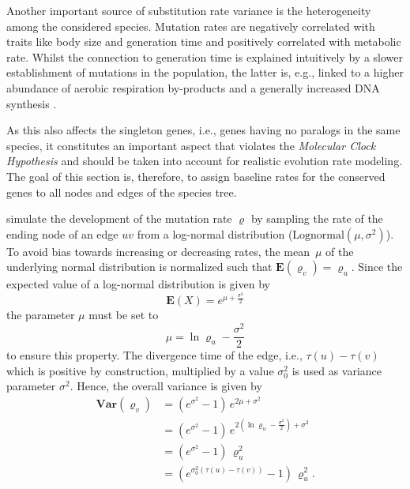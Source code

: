 \documentclass[hidelinks,11pt]{scrreprt}
\begin{document}
Another important source of substitution rate variance is the heterogeneity among the considered species. Mutation rates are negatively correlated with traits like body size and generation time and positively correlated with metabolic rate. Whilst the connection to generation time is explained intuitively by a slower establishment of mutations in the population, the latter is, e.g., linked to a higher abundance of aerobic respiration by-products and a generally increased DNA synthesis \citep{martin1993,gillooly2005,nabholz2007}.

As this also affects the singleton genes, i.e., genes having no paralogs in the same species, it constitutes an important aspect that violates the \emph{Molecular Clock Hypothesis} and should be taken into account for realistic evolution rate modeling.
The goal of this section is, therefore, to assign baseline rates for the conserved genes to all nodes and edges of the species tree.

\citet{kishino2001} simulate the development of the mutation rate $\varrho$ by sampling the rate of the ending node of an edge $uv$ from a log-normal distribution ($\textrm{Lognormal}(\mu,\sigma^2)$). To avoid bias towards increasing or decreasing rates, the mean~$\mu$ of the underlying normal distribution is normalized such that $\mathbf{E}(\varrho_v) = \varrho_u$. Since the expected value of a log-normal distribution is given by
\begin{equation}
\mathbf{E}(X) = e^{\mu + \frac{\sigma^2}{2}}
\end{equation}
the parameter $\mu$ must be set to 
\begin{equation}
\mu = \ln \varrho_u - \frac{\sigma^2}{2}
\end{equation}
to ensure this property. The divergence time of the edge, i.e., $\tau(u) - \tau(v)$ which is positive by construction, multiplied by a value $\sigma^2_0$ is used as variance parameter $\sigma^2$. Hence, the overall variance is given by
\begin{equation}
\begin{aligned}
\mathbf{Var}(\varrho_v) &= (e^{\sigma^2}-1)\, e^{2\mu+\sigma^2} \\
&= (e^{\sigma^2}-1)\, e^{2(\ln \varrho_u - \frac{\sigma^2}{2})+\sigma^2}\\
&= (e^{\sigma^2} - 1)\,\varrho_u^2\\
&= (e^{\sigma_0^2 (\tau(u)-\tau(v))} - 1)\,\varrho_u^2.
\end{aligned}
\end{equation}
\end{document}
